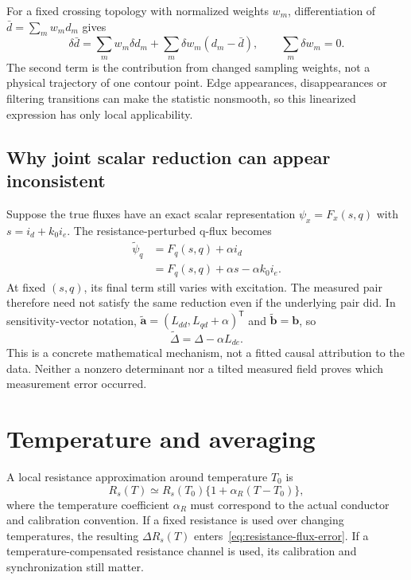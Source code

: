 For a fixed crossing topology with normalized weights $w_m$, differentiation of $\bar d=\sum_m w_m d_m$ gives
\begin{equation}
\delta\bar d=\sum_m w_m\delta d_m
+\sum_m\delta w_m(d_m-\bar d),
\qquad \sum_m\delta w_m=0.
\end{equation}
The second term is the contribution from changed sampling weights, not a physical trajectory of one contour point. Edge appearances, disappearances or filtering transitions can make the statistic nonsmooth, so this linearized expression has only local applicability.

\subsection{Why joint scalar reduction can appear inconsistent}
Suppose the true fluxes have an exact scalar representation $\psi_x=F_x(s,q)$ with $s=i_d+k_0i_e$. The resistance-perturbed q-flux becomes
\begin{align}
\widetilde\psi_q
&=F_q(s,q)+\alpha i_d\\
&=F_q(s,q)+\alpha s-\alpha k_0i_e.
\end{align}
At fixed $(s,q)$, its final term still varies with excitation. The measured pair therefore need not satisfy the same reduction even if the underlying pair did. In sensitivity-vector notation, $\widetilde{\bm a}=(L_{dd},L_{qd}+\alpha)^{\mathsf T}$ and $\widetilde{\bm b}=\bm b$, so
\begin{equation}
\widetilde\Delta=\Delta-\alpha L_{de}.
\end{equation}
This is a concrete mathematical mechanism, not a fitted causal attribution to the data. Neither a nonzero determinant nor a tilted measured field proves which measurement error occurred.

\section{Temperature and averaging}
A local resistance approximation around temperature $T_0$ is
\begin{equation}
R_s(T)\simeq R_s(T_0)\{1+\alpha_R(T-T_0)\},
\end{equation}
where the temperature coefficient $\alpha_R$ must correspond to the actual conductor and calibration convention. If a fixed resistance is used over changing temperatures, the resulting $\Delta R_s(T)$ enters~\eqref{eq:resistance-flux-error}. If a temperature-compensated resistance channel is used, its calibration and synchronization still matter.


